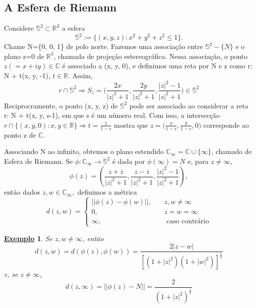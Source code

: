\documentclass{article}
\newtheorem{example}{\underline{Exemplo}}[section]
\begin{document}
  \subsection{A Esfera de Riemann}
  Considere $\mathbb{S}^{2}\subset{\mathbb{R}^{3}}$ a esfera 
  $$
  \mathbb{S}^{2}:= \{(x, y, z): x ^{2} + y ^{2} + z ^{2}\leq{1}\}.
  $$
  Chame N=\{0, 0, 1\} de polo norte. Fazemos uma associa\c c\~ao entre $\mathbb{S}^{2}-\{N\}$ e o plano z=0 de $\mathbb{R}^{3}$,
chamada de proje\c c\~ao estereogr\'afica. Nessa associa\c c\~ao, o ponto $z(=x + iy)\in\mathbb{C}$ \'e associado a (x, y, 0), e
definimos uma reta por N e z como r: N + t(x, y, -1), $t\in \mathbb{R}$. Assim,
  $$
  r\cap{\mathbb{S}^{2}} \Rightarrow S _{z} = \biggl(\frac{2x}{|z|^{2}+1}, \frac{2y}{|z|^{2}+1}, \frac{|z|^{2}-1}{|z|^{2}+1}\biggr)\in \mathbb{S}^{2}
  $$
  Reciprocramente, o ponto (x, y, z) de $\mathbb{S}^{2}$ pode ser associado ao considerar a reta r: N + t(x, y, s-1), em que
s \'e um n\'umero real. Com isso, a intersec\c c\~ao $r\cap \{(x, y, 0): x, y \in \mathbb{R}\}\Rightarrow t=\frac{1}{1-s}$ mostra que 
$z = \biggl(\frac{x}{1-s}, \frac{y}{1-s}, 0\biggr)$ corresponde ao ponto z de $\mathbb{C}$.
  
  Associando N ao infinito, obtemos o plano estendido $\mathbb{C}_{\infty} = \mathbb{C}\cup \{\infty\}$, chamado de Esfera de Riemann. Se $\phi:\mathbb{C}_{\infty}\rightarrow \mathbb{S}^{2}$
  \'e dada por $\phi(\infty) = N$ e, para $z\neq{\infty},$
    $$
    \phi(z) = (\frac{z + \overline{z}}{|z|^{2} + 1}, \frac{z - \overline{z}}{|z|^{2}+1}, \frac{|z|^{2}-1}{|z|^{2}+1}),
    $$
  ent\~ao dados $z, w\in \mathbb{C}_{\infty},$ definimos a m\'etrica
    $$
    d(z, w)=\left\{
      \begin{array}{ll}
        ||\phi(z) - \phi(w)||, & \quad z, w\neq{\infty} \\
        0, & \quad z = w = \infty \\
        \infty, & \quad \text{ caso contr\'ario}
      \end{array}\right.
    $$
   \begin{example}
     Se $z, w\neq{\infty}$, ent\~ao
     $$
     d(z, w) = d(\phi(z), \phi(w)) = \frac{2|z - w|}{[(1+|z|^{2})(1+|w|^{2})]^{\frac{1}{2}}}
     $$
    e, se $z\neq\infty$,
     $$
     d(z, \infty) = ||\phi(z) - N|| = \frac{2}{(1+|z|^{2})^{\frac{1}{2}}}
     $$
   \end{example}
\end{document}
